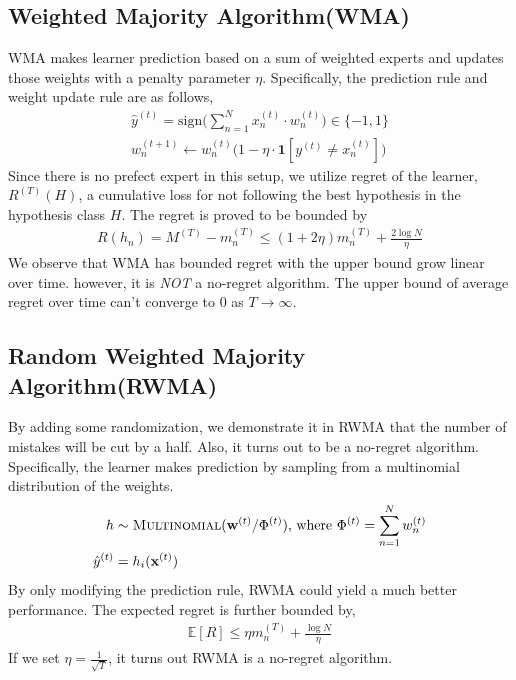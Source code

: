\documentclass[11pt]{article}
\begin{document}
\subsection{Weighted Majority Algorithm(WMA)}
WMA makes learner prediction based on a sum of weighted experts and updates those weights with a penalty parameter $\eta$. Specifically, the prediction rule and weight update rule are as follows,
\begin{align}
\hat{y}^{(t)} = \text{sign}\Big(\sum_{n=1}^Nx_n^{(t)}\cdot w_n^{(t)}\Big)\in\{-1, 1\} \\
w_n^{(t+1)}\leftarrow w_n^{(t)}\big(1-\eta\cdot\textbf{1}[y^{(t)}\neq x_n^{(t)}]\big)
\end{align}
Since there is no prefect expert in this setup, we utilize regret of the learner, $R^{(T)}(H)$, a cumulative loss for not following the best hypothesis in the hypothesis class $H$. The regret is proved to be bounded by
\begin{align}
    R(h_n) = M^{(T)} - m_n^{(T)} \leq (1+2\eta) m_n^{(T)} + \frac{2\log N}{\eta}
\end{align}
We observe that WMA has bounded regret with the upper bound grow linear over time. however, it is \textit{NOT} a no-regret algorithm. The upper bound of average regret over time can't converge to 0 as $T\rightarrow\infty$.  
\subsection{Random Weighted Majority Algorithm(RWMA)}
By adding some randomization, we demonstrate it in RWMA that the number of mistakes will be cut by a half. Also, it turns out to be a no-regret algorithm. Specifically, the learner makes prediction by sampling from a multinomial distribution of the weights. 
\begin{align}
h&\sim \textsc{Multinomial}(\textbf{w}^{(t)}/\Phi^{(t)})\text{, where } \Phi^{(t)}=\sum_{n=1}^Nw_n^{(t)} \nonumber \\
\hat{y}^{(t)}&=h_i(\textbf{x}^{(t)})
\end{align}
By only modifying the prediction rule, RWMA could yield a much better performance. The expected regret is further bounded by, 
\begin{align}
    \mathbb{E}[R] \leq \eta m_n^{(T)} + \frac{\log N}{\eta}
\end{align}
If we set $\eta=\frac{1}{\sqrt{T}}$, 
it turns out RWMA is a no-regret algorithm.
\end{document}

